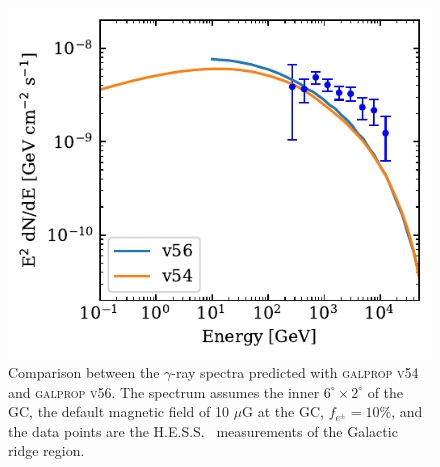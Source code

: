 \documentclass[doublespace,nopageskip]{VTthesis} %
\begin{document}
\begin{appendices}
\begin{figure}
\end{figure}


\begin{figure}
    \begin{center}
    \includegraphics[scale =1.0]{Figures/CTA/compare.pdf}
    \caption{Comparison between the $\gamma$-ray spectra predicted with \textsc{galprop v54} and \textsc{galprop v56}. The spectrum assumes the inner $6^\circ \times 2^\circ$ of the GC, the default magnetic field of 10 $\mu$G at the GC, $f_{e^\pm}=10\%$, and the data points are the H.E.S.S.~\citep{Aharonian:2006au} measurements of the Galactic ridge region.   }\label{fig:compareV54andV56}
    \end{center}
    
\end{figure}



\end{appendices}
\end{document}

